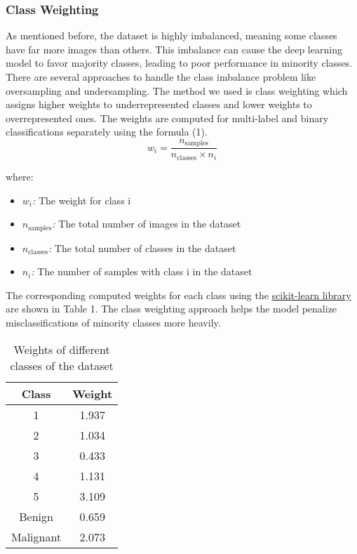 \documentclass[a4paper, twocolumn, 11pt]{article}
\begin{document}
\subsubsection{Class Weighting}
As mentioned before, the dataset is highly imbalanced, meaning some classes have far more images than others. This imbalance can cause the deep learning model to favor majority classes, leading to poor performance in minority classes. There are several approaches to handle the class imbalance problem like oversampling and undersampling. The method we used is class weighting which assigns higher weights to underrepresented classes and lower weights to overrepresented ones. The weights are computed for multi-label and binary classifications separately using the formula (1). 
\begin{equation}
w_i = \frac{n_{\text{samples}}}{n_{\text{classes}} \times n_i}
\end{equation}

where: 
\begin{itemize}
    \item \textit{$w_i$:} The weight for class  i
    \item \textit{$n_\text{samples}$:} The total number of images in the dataset
    \item \textit{$n_\text{classes}$:} The total number of classes in the dataset
    \item \textit{$n_i$:} The number of samples with class i in the dataset
\end{itemize}

The corresponding computed weights for each class using the \href{www.scikit-learn.org}{scikit-learn library} are shown in Table 1. The class weighting approach helps the model penalize misclassifications of minority classes more heavily. 

\begin{table}[h!]
    \centering
    \begingroup %
    \fontsize{9pt}{9pt}\selectfont %
    \begin{tabular}{|c|c|}
        \hline
        \rule{0pt}{10pt} \textbf{Class}  & \textbf{Weight} \\ 
        \hline
        \rule{0pt}{10pt} 1 & 1.937 \\ 
        \rule{0pt}{10pt} 2 & 1.034 \\ 
        \rule{0pt}{10pt} 3 & 0.433 \\ 
        \rule{0pt}{10pt} 4 & 1.131 \\
        \rule{0pt}{10pt} 5 & 3.109 \\
        \hline
        \rule{0pt}{10pt} Benign & 0.659 \\
        \rule{0pt}{10pt} Malignant & 2.073 \\
        \hline
    \end{tabular}
    \endgroup %
    \caption{Weights of different classes of the dataset}
    \label{tab:example}
\end{table}
\end{document}
